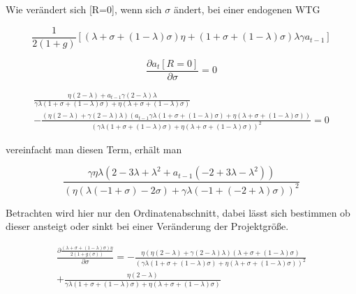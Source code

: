 Wie verändert sich [R=0], wenn sich $\sigma$ ändert, bei einer endogenen WTG


\begin{equation}
\frac{1}{2(1+g)}[(\lambda+\sigma+(1-\lambda)\sigma)\eta+(1+\sigma+(1-\lambda)\sigma)\lambda\gamma a_{t-1}]
\end{equation}


\begin{equation}
\frac{\partial a_t[R=0]}{\partial\sigma}=0
\end{equation}


\begin{equation}
\begin{split}
\frac{\eta (2 - \lambda) +a_{t-1} \gamma(2 - \lambda) \lambda}{\gamma \lambda (1 + \sigma +(1- \lambda) \sigma)+ \eta (\lambda + \sigma + (1- \lambda) \sigma)}\\
- \frac{ (\eta (2- \lambda)+ \gamma (2 - \lambda) \lambda)(a_{t-1} \gamma \lambda (1+ \sigma +(1- \lambda)\sigma) + \eta (\lambda + \sigma + (1 -\lambda) \sigma))}{(\gamma \lambda (1+ \sigma + (1 - \lambda) \sigma)+ \eta (\lambda + \sigma + (1 - \lambda) \sigma))^{2}}=0
\end{split}
\end{equation}


vereinfacht man diesen Term, erhält man


\begin{equation}
\frac{\gamma \eta \lambda (2 -3 \lambda +\lambda^{2} + a_{t-1} (-2 +3 \lambda -\lambda^{2}))}{(\eta ( \lambda(-1 + \sigma) -2 \sigma) + \gamma \lambda(-1 +(-2 + \lambda) \sigma))^{2}}
\end{equation}


Betrachten wird hier nur den Ordinatenabschnitt, dabei lässt sich bestimmen ob dieser ansteigt oder sinkt bei einer Veränderung der Projektgrö{\ss}e. 


\begin{equation}
\begin{split}
\frac{\partial\frac{(\lambda + \sigma + (1- \lambda) \sigma) \eta}{2(1+ g(\sigma))}}{\partial\sigma}=- \frac{\eta( \eta (2- \lambda) + \gamma (2- \lambda) \lambda)(\lambda + \sigma + (1- \lambda) \sigma)}{(\gamma \lambda (1+ \sigma +(1- \lambda) \sigma) + \eta( \lambda + \sigma + (1- \lambda) \sigma))^{2}}\\
+ \frac{\eta (2- \lambda)}{\gamma \lambda (1+ \sigma +(1- \lambda) \sigma) + \eta( \lambda + \sigma + (1- \lambda) \sigma)}
\end{split}
\end{equation}


